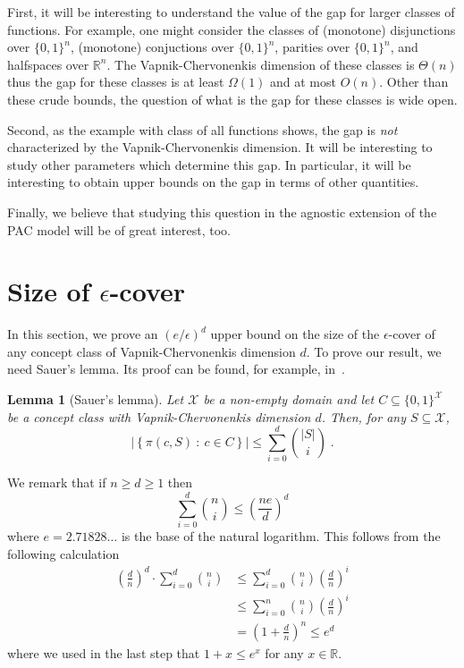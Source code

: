 \documentclass[11pt]{article}
\newtheorem{lemma}[proposition]{Lemma}
\newcommand{\R}{\mathbb{R}}
\newcommand{\X}{\mathcal{X}}
\begin{document}
First, it will be interesting to understand the value of the gap for larger
classes of functions. For example, one might consider the classes of (monotone)
disjunctions over $\{0,1\}^n$, (monotone) conjuctions over $\{0,1\}^n$, parities
over $\{0,1\}^n$, and halfspaces over $\R^n$. The Vapnik-Chervonenkis dimension
of these classes is $\Theta(n)$ thus the gap for these classes is at least
$\Omega(1)$ and at most $O(n)$. Other than these crude bounds, the question of
what is the gap for these classes is wide open.

Second, as the example with class of all functions shows, the gap is \emph{not}
characterized by the Vapnik-Chervonenkis dimension. It will be interesting to
study other parameters which determine this gap. In particular, it will be
interesting to obtain upper bounds on the gap in terms of other quantities.

Finally, we believe that studying this question in the agnostic extension of the
PAC model \citep[Chapter~2]{Anthony-Bartlett-1999} will be of great interest,
too.





\appendix
\clearpage
\section{Size of $\epsilon$-cover}
\label{section:epsilon-cover}

In this section, we prove an $(e/\epsilon)^d$ upper bound on the size of the
$\epsilon$-cover of any concept class of Vapnik-Chervonenkis dimension $d$. To
prove our result, we need Sauer's lemma. Its proof can be found, for example,
in~\citet[Chapter 3]{Anthony-Bartlett-1999}.

\begin{lemma}[Sauer's lemma]
Let $\X$ be a non-empty domain and let $C \subseteq \{0,1\}^\X$ be a concept class
with Vapnik-Chervonenkis dimension $d$. Then, for any $S \subseteq \X$,
$$
\left| \left\{ \pi(c, S) ~:~ c \in C \right\} \right| \le \sum_{i=0}^d \binom{|S|}{i} \; .
$$
\end{lemma}

We remark that if $n \ge d \ge 1$ then
\begin{equation}
\label{equation:sauer-lemma-estimate}
\sum_{i=0}^d \binom{n}{i} \le \left( \frac{ne}{d} \right)^d
\end{equation}
where $e = 2.71828 \dots$ is the base of the natural logarithm. This follows
from the following calculation
\begin{align*}
\left( \frac{d}{n} \right)^d \cdot \sum_{i=0}^d \binom{n}{i}
& \le \sum_{i=0}^d \binom{n}{i} \left( \frac{d}{n} \right)^i \\
& \le \sum_{i=0}^n \binom{n}{i} \left( \frac{d}{n} \right)^i \\
& = \left(1 + \frac{d}{n} \right)^n \le e^d
\end{align*}
where we used in the last step that $1 + x \le e^x$ for any $x \in \R$.
\end{document}
